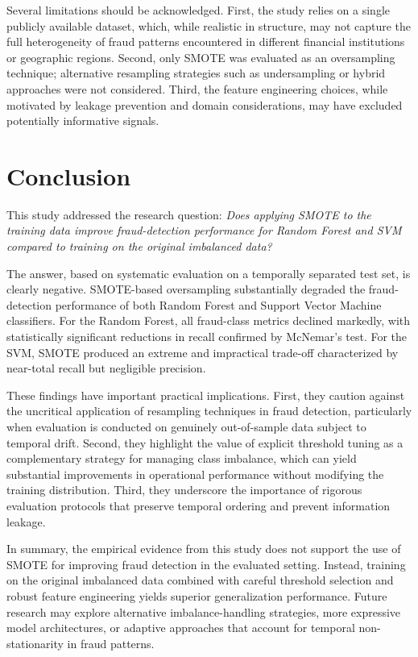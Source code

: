 \documentclass[oneside,12pt,parskip=half,american,numbers=noenddot]{scrreprt}
\begin{document}
Several limitations should be acknowledged. First, the study relies on a single publicly available dataset, which, while realistic in structure, may not capture the full heterogeneity of fraud patterns encountered in different financial institutions or geographic regions. Second, only SMOTE was evaluated as an oversampling technique; alternative resampling strategies such as undersampling or hybrid approaches were not considered. Third, the feature engineering choices, while motivated by leakage prevention and domain considerations, may have excluded potentially informative signals.

\section{Conclusion}

This study addressed the research question: \textit{Does applying SMOTE to the training data improve fraud-detection performance for Random Forest and SVM compared to training on the original imbalanced data?}

The answer, based on systematic evaluation on a temporally separated test set, is clearly negative. SMOTE-based oversampling substantially degraded the fraud-detection performance of both Random Forest and Support Vector Machine classifiers. For the Random Forest, all fraud-class metrics declined markedly, with statistically significant reductions in recall confirmed by McNemar's test. For the SVM, SMOTE produced an extreme and impractical trade-off characterized by near-total recall but negligible precision.

These findings have important practical implications. First, they caution against the uncritical application of resampling techniques in fraud detection, particularly when evaluation is conducted on genuinely out-of-sample data subject to temporal drift. Second, they highlight the value of explicit threshold tuning as a complementary strategy for managing class imbalance, which can yield substantial improvements in operational performance without modifying the training distribution. Third, they underscore the importance of rigorous evaluation protocols that preserve temporal ordering and prevent information leakage.

In summary, the empirical evidence from this study does not support the use of SMOTE for improving fraud detection in the evaluated setting. Instead, training on the original imbalanced data combined with careful threshold selection and robust feature engineering yields superior generalization performance. Future research may explore alternative imbalance-handling strategies, more expressive model architectures, or adaptive approaches that account for temporal non-stationarity in fraud patterns.
\end{document}
